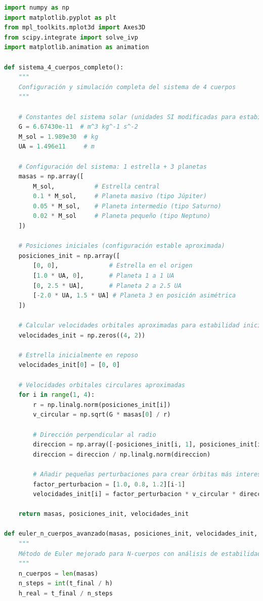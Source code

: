 \documentclass{article}
\begin{document}
	\begin{lstlisting}[language=Python, caption={Sistema completo de 4 cuerpos con análisis dinámico}]
import numpy as np
import matplotlib.pyplot as plt
from mpl_toolkits.mplot3d import Axes3D
from scipy.integrate import solve_ivp
import matplotlib.animation as animation

def sistema_4_cuerpos_completo():
    """
    Configuración y simulación completa del sistema de 4 cuerpos
    """
    
    # Constantes del sistema solar (unidades SI modificadas para estabilidad)
    G = 6.67430e-11  # m^3 kg^-1 s^-2
    M_sol = 1.989e30  # kg
    UA = 1.496e11     # m
    
    # Configuración del sistema: 1 estrella + 3 planetas
    masas = np.array([
        M_sol,           # Estrella central
        0.1 * M_sol,     # Planeta masivo (tipo Júpiter)
        0.05 * M_sol,    # Planeta intermedio (tipo Saturno)
        0.02 * M_sol     # Planeta pequeño (tipo Neptuno)
    ])
    
    # Posiciones iniciales (configuración estable aproximada)
    posiciones_init = np.array([
        [0, 0],              # Estrella en el origen
        [1.0 * UA, 0],       # Planeta 1 a 1 UA
        [0, 2.5 * UA],       # Planeta 2 a 2.5 UA
        [-2.0 * UA, 1.5 * UA] # Planeta 3 en posición asimétrica
    ])
    
    # Calcular velocidades orbitales aproximadas para estabilidad inicial
    velocidades_init = np.zeros((4, 2))
    
    # Estrella inicialmente en reposo
    velocidades_init[0] = [0, 0]
    
    # Velocidades orbitales circulares aproximadas
    for i in range(1, 4):
        r = np.linalg.norm(posiciones_init[i])
        v_circular = np.sqrt(G * masas[0] / r)
        
        # Dirección perpendicular al radio
        direccion = np.array([-posiciones_init[i, 1], posiciones_init[i, 0]])
        direccion = direccion / np.linalg.norm(direccion)
        
        # Añadir pequeñas perturbaciones para crear órbitas más interesantes
        factor_perturbacion = [1.0, 0.8, 1.2][i-1]
        velocidades_init[i] = factor_perturbacion * v_circular * direccion
    
    return masas, posiciones_init, velocidades_init

def euler_n_cuerpos_avanzado(masas, posiciones_init, velocidades_init, t_final, h):
    """
    Método de Euler mejorado para N-cuerpos con análisis de estabilidad
    """
    n_cuerpos = len(masas)
    n_steps = int(t_final / h)
    h_real = t_final / n_steps
    

\end{lstlisting}
\end{document}
